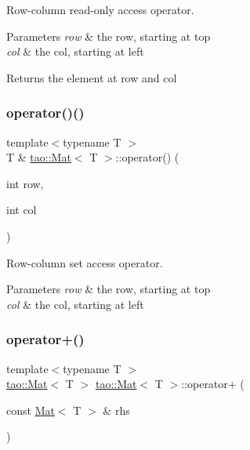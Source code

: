 Row-\/column read-\/only access operator. 


\begin{DoxyParams}{Parameters}
{\em row} & the row, starting at top \\
\hline
{\em col} & the col, starting at left \\
\hline
\end{DoxyParams}
\begin{DoxyReturn}{Returns}
the element at row and col 
\end{DoxyReturn}
\mbox{\label{classtao_1_1_mat_ac0372cf9e7da0ab734e7c58888e5d85a}} 
\subsubsection{\texorpdfstring{operator()()}{operator()()}\hspace{0.1cm}{\footnotesize\ttfamily [2/2]}}
{\footnotesize\ttfamily template$<$typename T $>$ \\
T \& \mbox{\hyperlink{classtao_1_1_mat}{tao\+::\+Mat}}$<$ T $>$\+::operator() (\begin{DoxyParamCaption}\item[{int}]{row,  }\item[{int}]{col }\end{DoxyParamCaption})}



Row-\/column set access operator. 


\begin{DoxyParams}{Parameters}
{\em row} & the row, starting at top \\
\hline
{\em col} & the col, starting at left \\
\hline
\end{DoxyParams}
\mbox{\label{classtao_1_1_mat_a84cc1217fbedd04adbcc6068d7fd493a}} 
\subsubsection{\texorpdfstring{operator+()}{operator+()}}
{\footnotesize\ttfamily template$<$typename T $>$ \\
\mbox{\hyperlink{classtao_1_1_mat}{tao\+::\+Mat}}$<$ T $>$ \mbox{\hyperlink{classtao_1_1_mat}{tao\+::\+Mat}}$<$ T $>$\+::operator+ (\begin{DoxyParamCaption}\item[{const \mbox{\hyperlink{classtao_1_1_mat}{Mat}}$<$ T $>$ \&}]{rhs }\end{DoxyParamCaption})}



